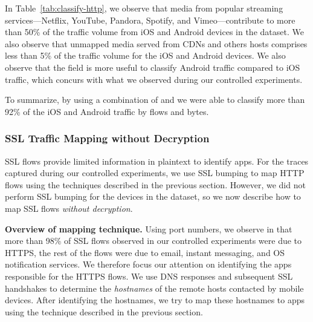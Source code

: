 In Table~\ref{tab:classify-http}, we observe that media from popular streaming services---Netflix, YouTube, Pandora, Spotify, and Vimeo---contribute to more than 50\% of the traffic volume from iOS and Android devices in the \mobWild dataset.
We also observe that unmapped media served from CDNs and others hosts comprises less than 5\% of the traffic volume for the iOS and Android devices. 
We also observe that the \httphost field is more useful to classify Android traffic compared to iOS traffic, which concurs with what we observed during our controlled experiments. 

To summarize, by using a combination of \useragent and \httphost we were able to classify more than 92\% of the iOS and Android traffic by flows and bytes. 

\subsubsection{SSL Traffic Mapping without Decryption}

SSL flows provide limited information in plaintext to identify apps. 
For the traces captured during our controlled experiments, we use SSL bumping to map HTTP flows using the techniques described in the previous section. 
However, we did not perform SSL bumping for the devices in the \mobWild dataset, so we now describe how to 
map SSL flows \emph{without decryption}. 

\noindent\textbf{Overview of mapping technique.}
Using port numbers, we observe in that more than 98\% of SSL flows observed in our controlled experiments were due to HTTPS, the rest of the flows were due to email, instant messaging, and OS notification services. 
We therefore focus our attention on identifying the apps responsible for the HTTPS flows.
We use DNS responses and subsequent SSL handshakes to determine the \emph{hostnames} of the remote hosts contacted by mobile devices.
After identifying the hostnames, we try to map these hostnames to apps using the technique described in the previous section.



